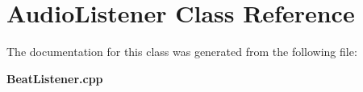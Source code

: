 \section{Audio\+Listener Class Reference}
\label{class_audio_listener}


The documentation for this class was generated from the following file\+:\begin{DoxyCompactItemize}
\item 
{\bf Beat\+Listener.\+cpp}\end{DoxyCompactItemize}
